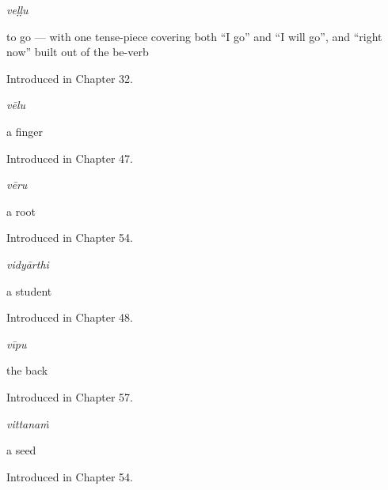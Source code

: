 \noindent\begin{minipage}[t]{\linewidth}
\raggedright
\textbf{}\enspace\emph{veḷḷu}\par
\small to go — with one tense-piece covering both \textquotedblleft{}I go\textquotedblright{} and \textquotedblleft{}I will go\textquotedblright{}, and \textquotedblleft{}right now\textquotedblright{} built out of the be-verb\par
\footnotesize Introduced in Chapter 32.
\end{minipage}\par\medskip

\noindent\begin{minipage}[t]{\linewidth}
\raggedright
\textbf{}\enspace\emph{vēlu}\par
\small a finger\par
\footnotesize Introduced in Chapter 47.
\end{minipage}\par\medskip

\noindent\begin{minipage}[t]{\linewidth}
\raggedright
\textbf{}\enspace\emph{vēru}\par
\small a root\par
\footnotesize Introduced in Chapter 54.
\end{minipage}\par\medskip

\noindent\begin{minipage}[t]{\linewidth}
\raggedright
\textbf{}\enspace\emph{vidyārthi}\par
\small a student\par
\footnotesize Introduced in Chapter 48.
\end{minipage}\par\medskip

\noindent\begin{minipage}[t]{\linewidth}
\raggedright
\textbf{}\enspace\emph{vīpu}\par
\small the back\par
\footnotesize Introduced in Chapter 57.
\end{minipage}\par\medskip

\noindent\begin{minipage}[t]{\linewidth}
\raggedright
\textbf{}\enspace\emph{vittanaṁ}\par
\small a seed\par
\footnotesize Introduced in Chapter 54.
\end{minipage}\par\medskip

